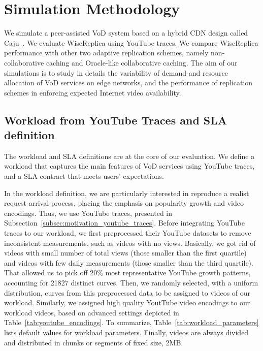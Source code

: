 \section{Simulation Methodology}
\label{sec:simulation_methodology}

We simulate a peer-assisted VoD system based on a hybrid CDN design called Caju~\cite{caju_tr_2012}. We evaluate WiseReplica using YouTube traces. We compare WiseReplica performance with other two adaptive replication schemes, namely non-collaborative caching and Oracle-like collaborative caching. The aim of our simulations is to study in details the variability of demand and resource allocation of VoD services on edge networks, and the performance of replication schemes in enforcing expected Internet video availability.

\subsection{Workload from YouTube Traces and SLA definition}
\label{subsec:methodology_workload}

The workload and SLA definitions are at the core of our evaluation. We define a workload that captures the main features of VoD services using YouTube traces, and a SLA contract that meets users' expectations. 
 
In the workload definition, we are particularly interested in reproduce a realist request arrival process, placing the emphasis on popularity growth and video encodings. Thus, we use YouTube traces, presented in Subsection~\ref{subsec:motivation_youtube_traces}. Before integrating YouTube traces to our workload, we first preprocessed their YouTube datasets to remove inconsistent measurements, such as videos with no views. Basically, we got rid of videos with small number of total views (those smaller than the first quartile) and videos with few daily measurements (those smaller than the third quartile). That allowed us to pick off 20\% most representative YouTube growth patterns, accounting for 21827 distinct curves. Then, we randomly selected, with a uniform distribution, curves from this preprocessed data to be assigned to videos of our workload. Similarly, we assigned high quality YoutTube video encodings  to our workload videos, based on advanced settings depicted in Table~\ref{tab:youtube_encodings}. To summarize, Table~\ref{tab:workload_parameters} lists default values for workload parameters. Finally, videos are always divided and distributed in chunks or segments of fixed size, 2MB.

